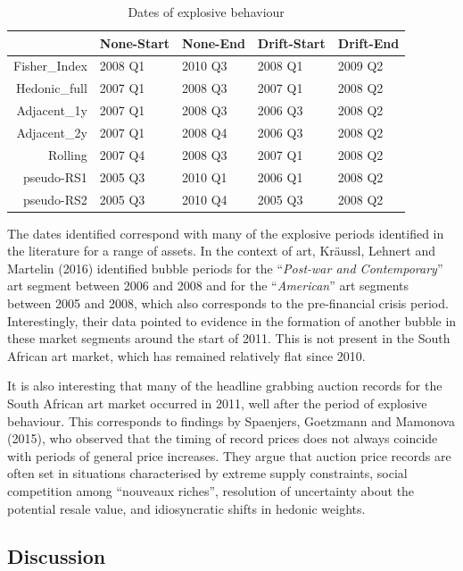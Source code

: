 \documentclass[12pt,]{article}
\begin{document}
\begin{table}[ht]
\centering
\caption{Dates of explosive behaviour} 
\begin{tabular}{rllll}
  \hline
 & None-Start & None-End & Drift-Start & Drift-End \\ 
  \hline
Fisher\_Index & 2008 Q1 & 2010 Q3 & 2008 Q1 & 2009 Q2 \\ 
  Hedonic\_full & 2007 Q1 & 2008 Q3 & 2007 Q1 & 2008 Q2 \\ 
  Adjacent\_1y & 2007 Q1 & 2008 Q3 & 2006 Q3 & 2008 Q2 \\ 
  Adjacent\_2y & 2007 Q1 & 2008 Q4 & 2006 Q3 & 2008 Q2 \\ 
  Rolling & 2007 Q4 & 2008 Q3 & 2007 Q1 & 2008 Q2 \\ 
  pseudo-RS1 & 2005 Q3 & 2010 Q1 & 2006 Q1 & 2008 Q2 \\ 
  pseudo-RS2 & 2005 Q3 & 2010 Q4 & 2005 Q3 & 2008 Q2 \\ 
   \hline
\end{tabular}
\end{table}

The dates identified correspond with many of the explosive periods
identified in the literature for a range of assets. In the context of
art, Kräussl, Lehnert and Martelin (2016) identified bubble periods for
the ``\emph{Post-war and Contemporary}'' art segment between 2006 and
2008 and for the ``\emph{American}'' art segments between 2005 and 2008,
which also corresponds to the pre-financial crisis period.
Interestingly, their data pointed to evidence in the formation of
another bubble in these market segments around the start of 2011. This
is not present in the South African art market, which has remained
relatively flat since 2010.

It is also interesting that many of the headline grabbing auction
records for the South African art market occurred in 2011, well after
the period of explosive behaviour. This corresponds to findings by
Spaenjers, Goetzmann and Mamonova (2015), who observed that the timing
of record prices does not always coincide with periods of general price
increases. They argue that auction price records are often set in
situations characterised by extreme supply constraints, social
competition among ``nouveaux riches'', resolution of uncertainty about
the potential resale value, and idiosyncratic shifts in hedonic weights.

\subsection{Discussion}\label{discussion}
\end{document}
